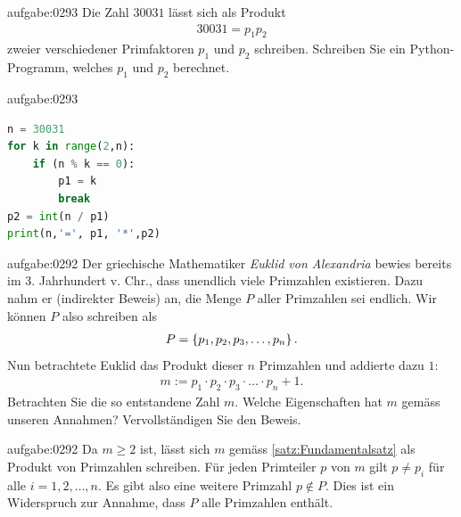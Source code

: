 \begin{aufgabe}{aufgabe:0293}
Die Zahl $30031$ lässt sich als Produkt
\begin{align*}
    30031 = p_1p_2
\end{align*}
zweier verschiedener Primfaktoren $p_1$ und $p_2$ schreiben. Schreiben Sie ein Python-Programm, welches $p_1$ und $p_2$ berechnet.
\end{aufgabe}
\begin{antwort}{aufgabe:0293}
\begin{lstlisting}[language=Python]
n = 30031
for k in range(2,n):
    if (n % k == 0):
        p1 = k
        break
p2 = int(n / p1)
print(n,'=', p1, '*',p2)
\end{lstlisting}
\end{antwort}


\begin{aufgabe}{aufgabe:0292}
Der griechische Mathematiker \textit{Euklid von Alexandria} bewies bereits im 3. Jahrhundert v. Chr., dass unendlich viele Primzahlen existieren. Dazu nahm er (indirekter Beweis) an, die Menge $P$ aller Primzahlen sei endlich. Wir können $P$ also schreiben als
\begin{align*}
    P = \left\{p_1, p_2, p_3, \ldots , p_n\right\}.
\end{align*}
Nun betrachtete Euklid das Produkt dieser $n$ Primzahlen und addierte dazu $1$:
\begin{align*}
    m := p_1\cdot p_2\cdot p_3\cdot \ldots \cdot p_n + 1.
\end{align*}
Betrachten Sie die so entstandene Zahl $m$. Welche Eigenschaften hat $m$ gemäss unseren Annahmen? Vervollständigen Sie den Beweis.
\end{aufgabe}
\begin{antwort}{aufgabe:0292}
Da $m\geq 2$ ist, lässt sich $m$ gemäss \cref{satz:Fundamentalsatz} als Produkt von Primzahlen schreiben. Für jeden Primteiler $p$ von $m$ gilt $p\neq p_i$ für alle $i=1,2,\ldots , n$. Es gibt also eine weitere Primzahl $p\notin P$. Dies ist ein Widerspruch zur Annahme, dass $P$ alle Primzahlen enthält.
\end{antwort}



